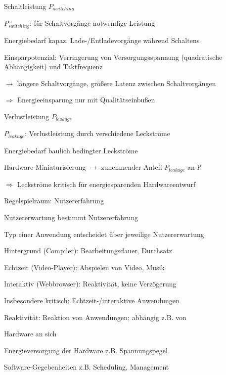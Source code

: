 \documentclass[a4paper]{article}
\begin{document}
\begin{multicols}{3}
    Schaltleistung $P_{switching}$
    \begin{itemize*}
        \item $P_{switching}$: für Schaltvorgänge notwendige Leistung
        \item Energiebedarf kapaz. Lade-/Entladevorgänge während Schaltens
        \item Einsparpotenzial: Verringerung von Versorgungsspannung (quadratische Abhängigkeit) und Taktfrequenz
        \item[$\rightarrow$] längere Schaltvorgänge, größere Latenz zwischen Schaltvorgängen
        \item[$\Rightarrow$] Energieeinsparung nur mit Qualitätseinbußen
    \end{itemize*}

    Verlustleistung $P_{leakage}$
    \begin{itemize*}
        \item $P_{leakage}$: Verlustleistung durch verschiedene Leckströme
        \item Energiebedarf baulich bedingter Leckströme
        \item Hardware-Miniaturisierung $\rightarrow$ zunehmender Anteil $P_{leakage}$ an P
        \item[$\Rightarrow$] Leckströme kritisch für energiesparenden Hardwareentwurf
    \end{itemize*}

    Regelspielraum: Nutzererfahrung
    \begin{itemize*}
        \item Nutzererwartung bestimmt Nutzererfahrung
        \item Typ einer Anwendung entscheidet über jeweilige Nutzererwartung
        \begin{enumerate*}
            \item Hintergrund (Compiler): Bearbeitungsdauer, Durchsatz
            \item Echtzeit (Video-Player): Abspielen von Video, Musik
            \item Interaktiv (Webbrowser): Reaktivität, keine Verzögerung
        \end{enumerate*}
        \item Insbesondere kritisch: Echtzeit-/interaktive Anwendungen
        \item Reaktivität: Reaktion von Anwendungen; abhängig z.B. von
        \begin{description*}
            \item[Hardware] an sich
            \item[Energieversorgung] der Hardware z.B. Spannungspegel
            \item[Software-Gegebenheiten] z.B. Scheduling, Management
        \end{description*}
    \end{itemize*}


\end{multicols}
\end{document}
